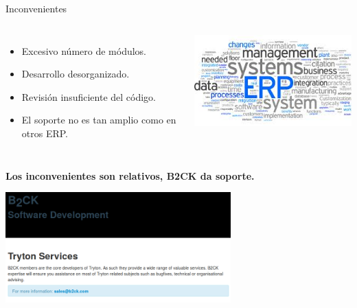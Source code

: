     \begin{frame}{Inconvenientes}
        \vspace*{-3mm}
        \fontsize{9}{8}\selectfont
        \begin{columns}
        \begin{itemize}
            \item Excesivo número de módulos.
            \item Desarrollo desorganizado.
            \item Revisión insuficiente del código.
            \item El soporte no es tan amplio como en otros ERP.
        \end{itemize}
        \includegraphics[width=\textwidth]{./Images/erp.jpeg}
    \end{columns}
    \begin{tcolorbox}[colback=ChetwodeBlue!10,colframe=ChetwodeBlue!60]
        \centering
        \fontsize{8}{8}\selectfont
        \textbf{ Los inconvenientes son relativos, B2CK da soporte.}
    \end{tcolorbox}
    \begin{center}
        \includegraphics[width=0.65\textwidth]{./Images/b2ck.png}
    \end{center}

    \end{frame}
